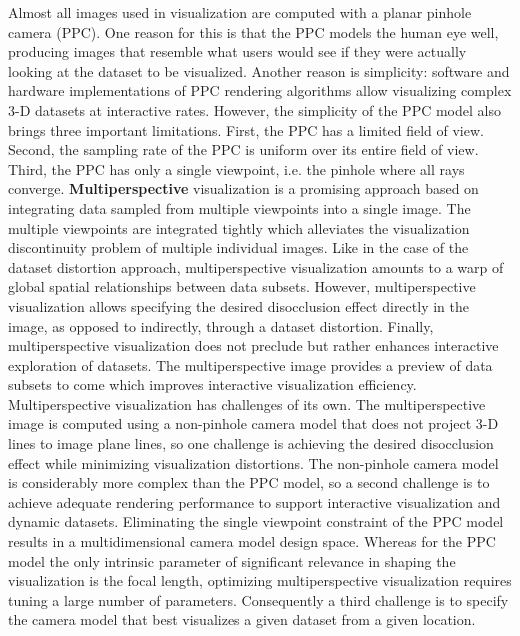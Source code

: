 Almost all images used in visualization are computed with a planar pinhole camera (PPC). One reason for this is that the PPC models the
human eye well, producing images that resemble what users would
see if they were actually looking at the dataset to be visualized.
Another reason is simplicity: software and hardware
implementations of PPC rendering algorithms allow visualizing
complex 3-D datasets at interactive rates. However, the simplicity of
the PPC model also brings three important limitations. First, the PPC
has a limited field of view. Second, the sampling rate of the PPC is
uniform over its entire field of view. Third, the PPC has only a single
viewpoint, i.e. the pinhole where all rays converge.
\newline \textbf{Multiperspective }  visualization is a promising approach based on
integrating data sampled from multiple viewpoints into a single
image. The multiple viewpoints are integrated tightly which
alleviates the visualization discontinuity problem of multiple
individual images. Like in the case of the dataset distortion approach,
multiperspective visualization amounts to a warp of global spatial
relationships between data subsets. However, multiperspective
visualization allows specifying the desired disocclusion effect
directly in the image, as opposed to indirectly, through a dataset
distortion. Finally, multiperspective visualization does not preclude
but rather enhances interactive exploration of datasets. The
multiperspective image provides a preview of data subsets to come
which improves interactive visualization efficiency. Multiperspective visualization has challenges of its own. The
multiperspective image is computed using a non-pinhole camera
model that does not project 3-D lines to image plane lines, so one
challenge is achieving the desired disocclusion effect while
minimizing visualization distortions. The non-pinhole camera model
is considerably more complex than the PPC model, so a second
challenge is to achieve adequate rendering performance to support
interactive visualization and dynamic datasets. Eliminating the single
viewpoint constraint of the PPC model results in a multidimensional
camera model design space. Whereas for the PPC model the only
intrinsic parameter of significant relevance in shaping the
visualization is the focal length, optimizing multiperspective
visualization requires tuning a large number of parameters.
Consequently a third challenge is to specify the camera model that
best visualizes a given dataset from a given location. \newline
